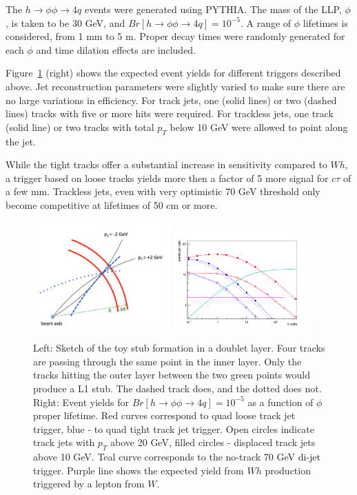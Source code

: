 The $h\rightarrow\phi\phi\rightarrow 4q$ events were generated using PYTHIA. The mass of the LLP, $\phi$, is taken to be 30 GeV,
and $Br[h\rightarrow\phi\phi\rightarrow 4q]=10^{-5}$. A range of $\phi$ lifetimes is considered, from 1 mm to 5 m.
Proper decay times were randomly generated for each $\phi$ and time dilation effects are included.

Figure~\ref{fig:tracktrigger_toy} (right) shows the expected event yields for different triggers described above.
Jet reconstruction parameters were slightly varied to make sure there are no large variations in efficiency.
For track jets, one (solid lines) or two (dashed lines) tracks with five or more hits were required.
For trackless jets, one track (solid line) or two tracks with total $p_T$ below 10 GeV were allowed to point along the jet.

While the tight tracks offer a substantial increase in sensitivity compared to $Wh$, a trigger based on loose tracks  
yields more then a factor of 5 more signal for $c\tau$ of a few mm. Trackless jets, even with very optimistic 70 GeV threshold
only become competitive at lifetimes of 50 cm or more.

\begin{figure}[t]\begin{center}
\includegraphics[width=0.47\textwidth]{figures/L1TT/geom.png}
\includegraphics[width=0.47\textwidth]{figures/L1TT/final_h125.png}
\caption{ Left: Sketch of the toy stub formation in a doublet layer. Four tracks are passing through the same point in the inner layer.
Only the tracks hitting the outer layer between the two green points would produce a L1 stub. The dashed track does, and the dotted does not.
Right: Event yields for $Br[h\rightarrow\phi\phi\rightarrow 4q]=10^{-5}$ as a function of 
$\phi$ proper lifetime. Red curves correspond to
quad loose track jet trigger, blue - to quad tight track jet trigger. 
Open circles indicate track jets with $p_T$ above 20 GeV, filled circles - displaced track jets above 10 GeV. 
Teal curve corresponds to the  no-track 70 GeV di-jet trigger.
Purple line shows the expected yield from $Wh$ production triggered by a lepton from $W$.
}
\label{fig:tracktrigger_toy}
\end{center}
\end{figure}

